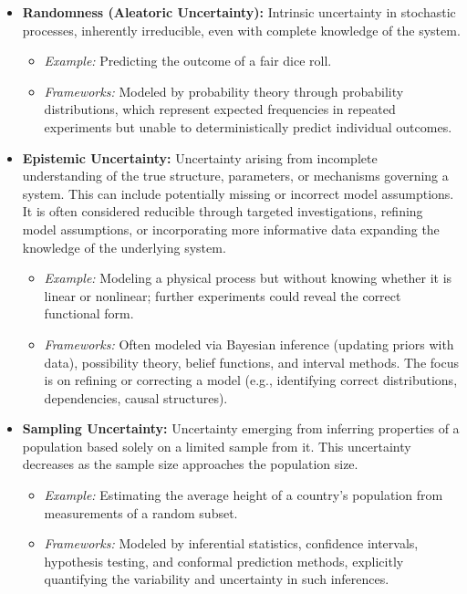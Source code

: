 \begin{itemize}
    \item \textbf{Randomness (Aleatoric Uncertainty):} Intrinsic uncertainty in stochastic processes, inherently irreducible, even with complete knowledge of the system.
    \begin{itemize}
        \item \textit{Example:} Predicting the outcome of a fair dice roll.
        \item \textit{Frameworks:} Modeled by probability theory through probability distributions, which represent expected frequencies in repeated experiments but unable to deterministically predict individual outcomes.
    \end{itemize}

    \item \textbf{Epistemic Uncertainty:} Uncertainty arising from incomplete understanding of the true structure, parameters, or mechanisms governing a system. This can include potentially missing or incorrect model assumptions. It is often considered reducible through targeted investigations, refining model assumptions, or incorporating more informative data expanding the knowledge of the underlying system.

    \begin{itemize}
        \item \textit{Example:} Modeling a physical process but without knowing whether it is linear or nonlinear; further experiments could reveal the correct functional form.
        \item \textit{Frameworks:} Often modeled via Bayesian inference (updating priors with data), possibility theory, belief functions, and interval methods. The focus is on refining or correcting a model (e.g., identifying correct distributions, dependencies, causal structures).
    \end{itemize}

    \item \textbf{Sampling Uncertainty:} Uncertainty emerging from inferring properties of a population based solely on a limited sample from it. This uncertainty decreases as the sample size approaches the population size.
    \begin{itemize}
        \item \textit{Example:} Estimating the average height of a country's population from measurements of a random subset. 
        \item \textit{Frameworks:} Modeled by inferential statistics, confidence intervals, hypothesis testing, and conformal prediction methods, explicitly quantifying the variability and uncertainty in such inferences.
    \end{itemize}
\end{itemize}

